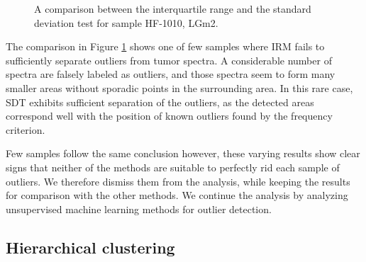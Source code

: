 \begin{figure}[h]

    \centering
    \qquad
    \caption{A comparison between the interquartile range and the standard deviation test for sample HF-1010, LGm2.
\label{fig:HF1010comp}}%
\end{figure}

The comparison in Figure \ref{fig:HF1010comp} shows one of few samples where IRM fails to sufficiently separate outliers from tumor spectra. A considerable number of spectra are falsely labeled as outliers, and those spectra seem to form many smaller areas without sporadic points in the surrounding area. In this rare case, SDT exhibits sufficient separation of the outliers, as the detected areas correspond well with the position of known outliers found by the frequency criterion.

Few samples follow the same conclusion however, these varying results show clear signs that neither of the methods are suitable to perfectly rid each sample of outliers. We therefore dismiss them from the analysis, while keeping the results for comparison with the other methods. We continue the analysis by analyzing unsupervised machine learning methods for outlier detection.

\subsection{Hierarchical clustering}

